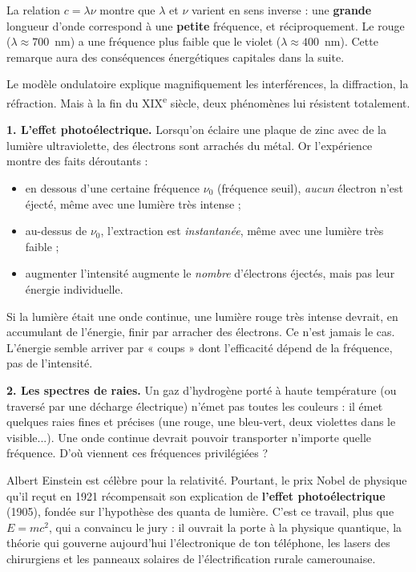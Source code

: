\documentclass[11pt]{article}
\newcounter{popsec}
\newcounter{popsub}
\newcommand{\courssub}[1]{%
  \stepcounter{popsub}%
  \par\vspace{9pt}\noindent{\popxbold\fontsize{11.5}{13}\selectfont\color{popink}{\color{poporange}\thepopsec.\thepopsub}\hspace{6pt}#1}\par\nopagebreak\vspace{4pt}
}
\begin{document}
\begin{attention}
La relation $c = \lambda \nu$ montre que $\lambda$ et $\nu$ varient en sens inverse : une \textbf{grande} longueur d'onde correspond à une \textbf{petite} fréquence, et réciproquement. Le rouge ($\lambda \approx 700$~nm) a une fréquence plus faible que le violet ($\lambda \approx 400$~nm). Cette remarque aura des conséquences énergétiques capitales dans la suite.
\end{attention}

\courssub{Les limites du modèle ondulatoire}

Le modèle ondulatoire explique magnifiquement les interférences, la diffraction, la réfraction. Mais à la fin du XIX\textsuperscript{e} siècle, deux phénomènes lui résistent totalement.

\textbf{1. L'effet photoélectrique.} Lorsqu'on éclaire une plaque de zinc avec de la lumière ultraviolette, des électrons sont arrachés du métal. Or l'expérience montre des faits déroutants :
\begin{itemize}
\item en dessous d'une certaine fréquence $\nu_0$ (fréquence seuil), \emph{aucun} électron n'est éjecté, même avec une lumière très intense ;
\item au-dessus de $\nu_0$, l'extraction est \emph{instantanée}, même avec une lumière très faible ;
\item augmenter l'intensité augmente le \emph{nombre} d'électrons éjectés, mais pas leur énergie individuelle.
\end{itemize}
Si la lumière était une onde continue, une lumière rouge très intense devrait, en accumulant de l'énergie, finir par arracher des électrons. Ce n'est jamais le cas. L'énergie semble arriver par « coups » dont l'efficacité dépend de la fréquence, pas de l'intensité.

\textbf{2. Les spectres de raies.} Un gaz d'hydrogène porté à haute température (ou traversé par une décharge électrique) n'émet pas toutes les couleurs : il émet quelques raies fines et précises (une rouge, une bleu-vert, deux violettes dans le visible...). Une onde continue devrait pouvoir transporter n'importe quelle fréquence. D'où viennent ces fréquences privilégiées ?

\begin{savaistu}
Albert Einstein est célèbre pour la relativité. Pourtant, le prix Nobel de physique qu'il reçut en 1921 récompensait son explication de \textbf{l'effet photoélectrique} (1905), fondée sur l'hypothèse des quanta de lumière. C'est ce travail, plus que $E = mc^2$, qui a convaincu le jury : il ouvrait la porte à la physique quantique, la théorie qui gouverne aujourd'hui l'électronique de ton téléphone, les lasers des chirurgiens et les panneaux solaires de l'électrification rurale camerounaise.
\end{savaistu}
\end{document}
